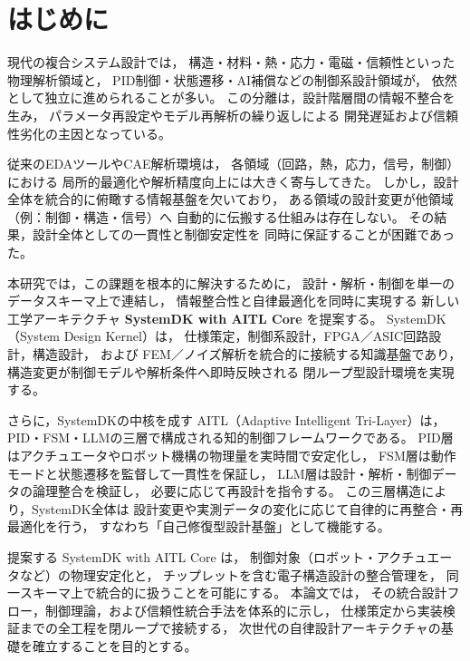 \section{はじめに}

現代の複合システム設計では，
構造・材料・熱・応力・電磁・信頼性といった物理解析領域と，
PID制御・状態遷移・AI補償などの制御系設計領域が，
依然として独立に進められることが多い。
この分離は，設計階層間の情報不整合を生み，
パラメータ再設定やモデル再解析の繰り返しによる
開発遅延および信頼性劣化の主因となっている。

従来のEDAツールやCAE解析環境は，
各領域（回路，熱，応力，信号，制御）における
局所的最適化や解析精度向上には大きく寄与してきた。
しかし，設計全体を統合的に俯瞰する情報基盤を欠いており，
ある領域の設計変更が他領域（例：制御・構造・信号）へ
自動的に伝搬する仕組みは存在しない。
その結果，設計全体としての一貫性と制御安定性を
同時に保証することが困難であった。

本研究では，この課題を根本的に解決するために，
設計・解析・制御を単一のデータスキーマ上で連結し，
情報整合性と自律最適化を同時に実現する
新しい工学アーキテクチャ
\textbf{SystemDK with AITL Core} を提案する。
SystemDK（System Design Kernel）は，
仕様策定，制御系設計，FPGA／ASIC回路設計，構造設計，
および FEM／ノイズ解析を統合的に接続する知識基盤であり，
構造変更が制御モデルや解析条件へ即時反映される
閉ループ型設計環境を実現する。

さらに，SystemDKの中核を成す
AITL（Adaptive Intelligent Tri-Layer）は，
PID・FSM・LLMの三層で構成される知的制御フレームワークである。
PID層はアクチュエータやロボット機構の物理量を実時間で安定化し，
FSM層は動作モードと状態遷移を監督して一貫性を保証し，
LLM層は設計・解析・制御データの論理整合を検証し，
必要に応じて再設計を指令する。
この三層構造により，SystemDK全体は
設計変更や実測データの変化に応じて自律的に再整合・再最適化を行う，
すなわち「自己修復型設計基盤」として機能する。

提案する SystemDK with AITL Core は，
制御対象（ロボット・アクチュエータなど）の物理安定化と，
チップレットを含む電子構造設計の整合管理を，
同一スキーマ上で統合的に扱うことを可能にする。
本論文では，
その統合設計フロー，制御理論，および信頼性統合手法を体系的に示し，
仕様策定から実装検証までの全工程を閉ループで接続する，
次世代の自律設計アーキテクチャの基礎を確立することを目的とする。
